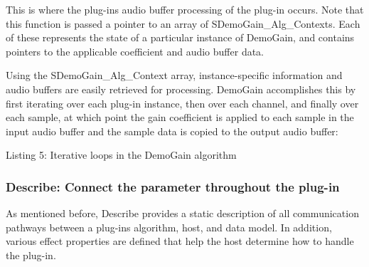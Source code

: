 This is where the plug-\/in\textquotesingle{}s audio buffer processing of the plug-\/in occurs. Note that this function is passed a pointer to an array of {\ttfamily S\+Demo\+Gain\+\_\+\+Alg\+\_\+\+Contexts}. Each of these represents the state of a particular instance of Demo\+Gain, and contains pointers to the applicable coefficient and audio buffer data.

Using the {\ttfamily S\+Demo\+Gain\+\_\+\+Alg\+\_\+\+Context} array, instance-\/specific information and audio buffers are easily retrieved for processing. Demo\+Gain accomplishes this by first iterating over each plug-\/in instance, then over each channel, and finally over each sample, at which point the gain coefficient is applied to each sample in the input audio buffer and the sample data is copied to the output audio buffer\+:


\begin{DoxyCode}{0}
\DoxyCodeLine{\textcolor{comment}{// --------- Iterate over plug -in instances ---------//}}
\DoxyCodeLine{\{}
\DoxyCodeLine{    \textcolor{comment}{// --------- Run processing loop over each input channel ---------//}}
\DoxyCodeLine{    \textcolor{comment}{//}}
\DoxyCodeLine{    \{}
\DoxyCodeLine{        \textcolor{comment}{// --------- Run processing loop over each sample ---------//}}
\DoxyCodeLine{        \textcolor{comment}{//}}
\DoxyCodeLine{        \{}
\DoxyCodeLine{        \} \textcolor{comment}{// Go to the next sample}}
\DoxyCodeLine{    \} \textcolor{comment}{// Go to next channel}}
\DoxyCodeLine{ \} \textcolor{comment}{// End instance-iteration loop }}
\end{DoxyCode}
  Listing 5\+: Iterative loops in the Demo\+Gain algorithm

\hypertarget{a00794_subsection__describe_connect_the_parameter_throughout_the_plugin}{}\subsubsection{Describe\+: Connect the parameter throughout the plug-\/in}\label{a00794_subsection__describe_connect_the_parameter_throughout_the_plugin}
 As mentioned before, Describe provides a static description of all communication pathways between a plug-\/in\textquotesingle{}s algorithm, host, and data model. In addition, various effect properties are defined that help the host determine how to handle the plug-\/in.

